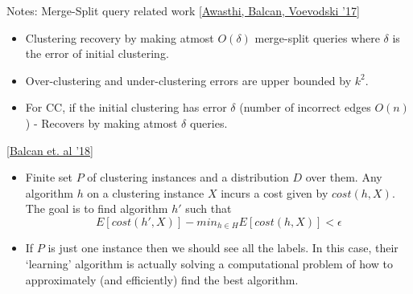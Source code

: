 \documentclass{beamer}
\begin{document}
\begin{frame}[label=notesMergeSplitQueryRelated]{Notes: Merge-Split query related work}
\hyperlink{underspecificityRelated}{[Awasthi, Balcan, Voevodski '17]}
\begin{itemize}
  \item Clustering recovery by making  atmost $O(\delta)$ merge-split queries where $\delta$ is the error of initial clustering. 
  \item Over-clustering and under-clustering errors are upper bounded by $k^2$.
  \item For CC, if the initial clustering has error $\delta$ (number of incorrect edges $O(n)$) - Recovers by making atmost $\delta$ queries.
  \end{itemize}
\hyperlink{underspecificityRelated}{[Balcan et. al '18]}
\begin{itemize}
  \item Finite set $P$ of clustering instances and a distribution $D$ over them. Any algorithm $h$ on a clustering instance $X$ incurs a cost given by $cost(h, X)$. The goal is to find algorithm $h'$ such that
$$E [ cost(h',  X) ]    -   min_{h \in H}   E [cost(h, X)]   < \epsilon$$
\item If $P$ is just one instance then we should see all the labels. In this case, their `learning' algorithm is actually solving a computational problem of how to approximately (and efficiently) find the best algorithm.  
\end{itemize}
\end{frame}
\end{document}
